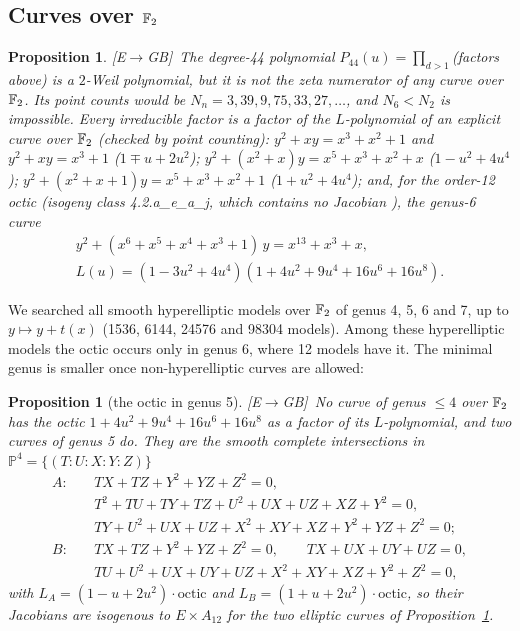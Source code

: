 \documentclass[11pt]{amsart}
\numberwithin{equation}{section}
\theoremstyle{plain}
\newtheorem{proposition}[theorem]{Proposition}
\theoremstyle{definition}\newtheorem{definition}[theorem]{Definition}
\theoremstyle{remark}\newtheorem{remark}[theorem]{Remark}
\newcommand{\ctag}[1]{\textup{\textsf{\scriptsize[#1]}}}
\begin{document}
\subsection{\texorpdfstring{Curves over $\mathbb{F}_2$}{Curves over F2}}
\begin{proposition}\label{prop:f2}
\ctag{E$\to$GB}\ The degree-44 polynomial $P_{44}(u)=\prod_{d>1}$(factors above) is a $2$-Weil polynomial, but it is not the zeta numerator of any curve over $\mathbb{F}_2$. Its point counts would be $N_n=3,39,9,75,33,27,\dots$, and $N_6<N_2$ is impossible. Every irreducible factor is a factor of the $L$-polynomial of an explicit curve over $\mathbb{F}_2$ (checked by point counting):
$y^2+xy=x^3+x^2+1$ and $y^2+xy=x^3+1$ ($1\mp u+2u^2$); $y^2+(x^2+x)y=x^5+x^3+x^2+x$ ($1-u^2+4u^4$); $y^2+(x^2+x+1)y=x^5+x^3+x^2+1$ ($1+u^2+4u^4$); and, for the order-12 octic (isogeny class 4.2.a\_e\_a\_j, which contains no Jacobian \cite{lmfdb}), the genus-6 curve
\begin{gather*}y^2+(x^6+x^5+x^4+x^3+1)\,y=x^{13}+x^3+x,\\ L(u)=(1-3u^2+4u^4)(1+4u^2+9u^4+16u^6+16u^8).\end{gather*}
\end{proposition}
\noindent We searched all smooth hyperelliptic models over $\mathbb{F}_2$ of genus 4, 5, 6 and 7, up to $y\mapsto y+t(x)$ (1536, 6144, 24576 and 98304 models). Among these hyperelliptic models the octic occurs only in genus 6, where 12 models have it. The minimal genus is smaller once non-hyperelliptic curves are allowed:
\begin{proposition}[the octic in genus 5]\label{prop:g5}
\ctag{E$\to$GB}\ No curve of genus $\le4$ over $\mathbb{F}_2$ has the octic $1+4u^2+9u^4+16u^6+16u^8$ as a factor of its $L$-polynomial, and two curves of genus 5 do. They are the smooth complete intersections in $\mathbb P^4=\{(T:U:X:Y:Z)\}$
\begin{align*}
A:\quad&TX+TZ+Y^2+YZ+Z^2=0,\\
&T^2+TU+TY+TZ+U^2+UX+UZ+XZ+Y^2=0,\\
&TY+U^2+UX+UZ+X^2+XY+XZ+Y^2+YZ+Z^2=0;\\
B:\quad&TX+TZ+Y^2+YZ+Z^2=0,\qquad TX+UX+UY+UZ=0,\\
&TU+U^2+UX+UY+UZ+X^2+XY+XZ+Y^2+Z^2=0,
\end{align*}
with $L_A=(1-u+2u^2)\cdot\text{octic}$ and $L_B=(1+u+2u^2)\cdot\text{octic}$, so their Jacobians are isogenous to $E\times A_{12}$ for the two elliptic curves of Proposition~\ref{prop:f2}.
\end{proposition}
\end{document}
